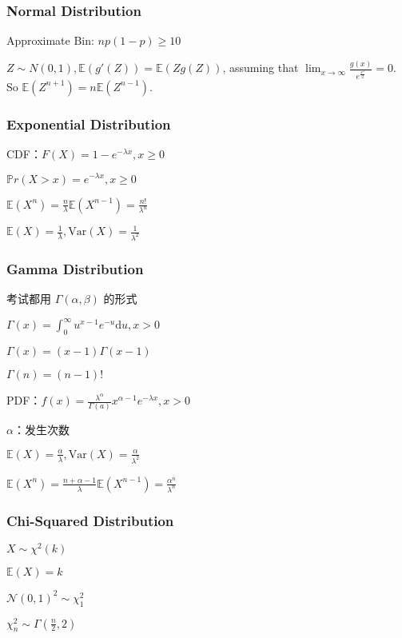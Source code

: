 \documentclass[9pt,landscape]{article}
\begin{document}
\begin{multicols}{3}
\subsubsection{Normal Distribution}

Approximate Bin: $np(1-p)\ge 10$

$Z\sim N(0, 1), \mathbb{E}(g'(Z))=\mathbb{E}(Zg(Z))$,  assuming that $\lim_{x\to \infty}\frac{g(x)}{e^{\frac{x^2}{2}}}=0$. So $\mathbb{E}(Z^{n+1})=n\mathbb{E}(Z^{n-1})$.

\subsubsection{Exponential Distribution}

CDF：$F(X)=1-e^{-\lambda x}, x\ge 0$

$\mathbb{P}r(X>x)=e^{-\lambda x}, x\ge 0$

$\mathbb{E}(X^n)=\frac{n}{\lambda}\mathbb{E}(X^{n-1})=\frac{n!}{\lambda^n}$

$\mathbb{E}(X)=\frac{1}{\lambda}, \mathrm{Var}(X)=\frac{1}{\lambda^2}$

\subsubsection{Gamma Distribution}

考试都用 $\Gamma(\alpha, \beta)$ 的形式

$\Gamma(x)=\int_{0}^{\infty}u^{x-1}e^{-u}\mathrm{d}u, x>0$

$\Gamma(x)=(x-1)\Gamma(x - 1)$

$\Gamma(n)=(n-1)!$

PDF：$f(x)=\frac{\lambda^\alpha}{\Gamma(a)}x^{\alpha - 1}e^{-\lambda x}, x>0$

$\alpha$：发生次数

$\mathbb{E}(X)=\frac{\alpha}{\lambda}, \mathrm{Var}(X)=\frac{\alpha}{\lambda^2}$

$\mathbb{E}(X^n)=\frac{n+\alpha-1}{\lambda}\mathbb{E}(X^{n-1})=\frac{\alpha^{\overline{n}}}{\lambda^n}$

\subsubsection{Chi-Squared Distribution}

$X\sim \chi^2(k)$

$\mathbb{E}(X)=k$

$\mathcal{N}(0, 1)^2\sim \chi^2_1$

$\chi^2_n\sim \Gamma\left(\frac{n}{2}, 2\right)$


\end{multicols}
\end{document}
